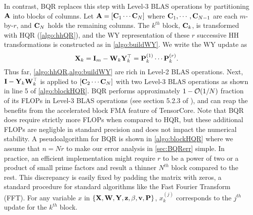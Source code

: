 In contrast, BQR replaces this step with Level-3 BLAS operations by partitioning $\mathbf{A}$ into blocks of columns.
Let $\mathbf{A} = [\mathbf{C}_1 \cdots  \mathbf{C}_N]$ where $\mathbf{C}_1,\cdots,\mathbf{C}_{N-1}$ are each $m$-by-$r$, and $\mathbf{C}_N$ holds the remaining columns.
The $k^{th}$ block, $\mathbf{C}_k$, is transformed with HQR (\cref{algo:hhQR}), and the WY representation of these $r$ successive HH transformations is constructed as in \cref{algo:buildWY}.
We write the WY update as
\begin{equation}
	\mathbf{X}_k = \mathbf{I}_m -\mathbf{W}_{k}\mathbf{Y}_{k}^{\top} = \mathbf{P}_k^{(1)}\cdots\mathbf{P}_{k}^{(r)}.
\end{equation}
Thus far, \cref{algo:hhQR,algo:buildWY} are rich in Level-2 BLAS operations.
Next, $\mathbf{I} -\mathbf{Y}_{k}\mathbf{W}_{k}^{\top}$ is applied to $[\mathbf{C}_2 \cdots  \mathbf{C}_N]$ with two Level-3 BLAS operations as shown in line 5 of \cref{algo:blockHQR}.
BQR performs approximately $1-\mathcal{O}(1/N)$ fraction of its FLOPs in Level-3 BLAS operations (see section 5.2.3 of \cite{golub2013matrix}), and can reap the benefits from the accelerated block FMA feature of TensorCore. 
Note that BQR does require strictly more FLOPs when compared to HQR, but these additional FLOPs are negligble in standard precision and does not impact the numerical stability.
A pseudoalgorithm for BQR is shown in \cref{algo:blockHQR} where we assume that $n=Nr$ to make our error analysis in \cref{sec:BQRerr} simple.
In practice, an efficient implementation might require $r$ to be a power of two or a product of small prime factors and result a thinner $N^{th}$ block compared to the rest. 
This discrepancy is easily fixed by padding the matrix with zeros, a standard procedure for standard algorithms like the Fast Fourier Transform (FFT).
For any variable $x$ in $\{\mathbf{X},\mathbf{W}, \mathbf{Y}, \mathbf{z}, \beta, \mathbf{v}, \mathbf{P}\}$,  $x_k^{(j)}$ corresponds to the $j^{th}$ update for the $k^{th}$ block.
